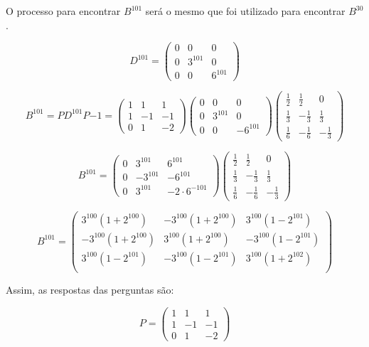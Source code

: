 \begin{enumerate}
	O processo para encontrar $B^{101}$ será o mesmo que
	foi utilizado para encontrar $B^{30}$.
	
	$$
	D^{101} =
	\begin{pmatrix}
		0 & 0 & 0 \\
		0 & 3^{101} & 0 \\
		0 & 0 & 6^{101}
	\end{pmatrix}	
	$$
	
	$$
	B^{101} = PD^{101}P{-1} = 
	\begin{pmatrix}
		1 & 1 & 1 \\
		1 & -1 & -1 \\
		0 & 1 & -2
	\end{pmatrix}
	\begin{pmatrix}
		0 & 0 & 0 \\
		0 & 3^{101} & 0 \\
		0 & 0 & -6^{101}
	\end{pmatrix}
	\begin{pmatrix}
		\frac{1}{2} & \frac{1}{2} & 0\\
		\frac{1}{3} & -\frac{1}{3} & \frac{1}{3}\\
		\frac{1}{6} & -\frac{1}{6} & -\frac{1}{3}
	\end{pmatrix}
	$$
	
	$$
	B^{101}=
	\begin{pmatrix}
		0 &  3^{101} &  6 ^{101} \\
		0 & -3^{101} & -6^{101} \\
		0 &  3^{101}  & -2 \cdot 6^{-101}
	\end{pmatrix}
	\begin{pmatrix}
		\frac{1}{2} & \frac{1}{2} & 0\\
		\frac{1}{3} & -\frac{1}{3} & \frac{1}{3}\\
		\frac{1}{6} & -\frac{1}{6} & -\frac{1}{3}
	\end{pmatrix}
	$$
	
	$$
	B^{101} = 
	\begin{pmatrix}
		3^{100}(1+2^{100}) & -3^{100}(1+2^{100}) & 3^{100}(1-2^{101}) \\
		-3^{100}(1+2^{100}) & 3^{100}(1+2^{100}) & -3^{100}(1-2^{101}) \\
		3^{100}(1-2^{101}) & -3^{100}(1-2^{101}) & 3^{100}(1+2^{102}) \\
	\end{pmatrix}
	$$
	
	Assim, as respostas das perguntas são:
	
	$$
	P = 
	\begin{pmatrix}
		1 & 1 & 1 \\
		1 & -1 & -1 \\
		0 & 1 & -2
	\end{pmatrix}
	$$
	

\end{enumerate}
